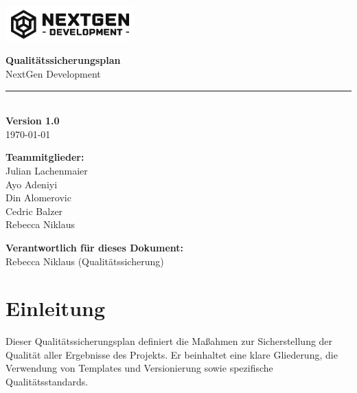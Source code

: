 \documentclass[a4paper,12pt]{article}
\begin{document}
\begin{titlepage}
    \begin{flushleft}
        \includegraphics[width=5cm]{logo.png}
    \end{flushleft}

    \vfill

    \begin{center}
        \Huge \textbf{Qualitätssicherungsplan} \\[1.0cm]
        \Large NextGen Development \\[0.5cm]
        \textcolor{gray}{\rule{0.8\textwidth}{0.4pt}} \\[0.5cm]
        \textbf{Version 1.0} \\[0.5cm] %
        \large \today \\[1.5cm]
    \end{center}

    \vfill

    \noindent
    \begin{minipage}[t]{0.45\textwidth}
        \textbf{Teammitglieder:}\\
        Julian Lachenmaier\\
        Ayo Adeniyi\\
        Din Alomerovic\\
        Cedric Balzer\\
        Rebecca Niklaus\\
    \end{minipage}%
    \hspace{1cm}
    \begin{minipage}[t]{0.45\textwidth}
        \textbf{Verantwortlich für dieses Dokument:}\\
        Rebecca Niklaus (Qualitätssicherung)\\
    \end{minipage}

\end{titlepage}

\tableofcontents
\newpage

\section{Einleitung}
Dieser Qualitätssicherungsplan definiert die Maßahmen zur Sicherstellung der Qualität aller Ergebnisse des Projekts. Er beinhaltet eine klare Gliederung, die Verwendung von Templates und Versionierung sowie spezifische Qualitätsstandards.
\end{document}
